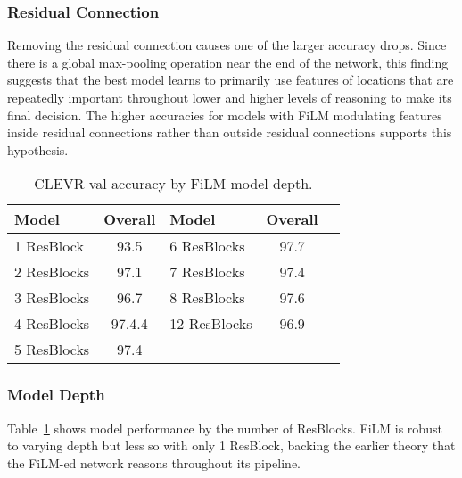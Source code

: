 \documentclass[letterpaper]{article} \usepackage{aaai18}  \usepackage{times}  \usepackage{helvet}  \usepackage{courier}  \usepackage{url}  \usepackage{graphicx}  \frenchspacing  \setlength{\pdfpagewidth}{8.5in}  \setlength{\pdfpageheight}{11in}
\begin{document}
        \subsubsection{Residual Connection}
		Removing the residual connection causes one of the larger accuracy drops. Since there is a global max-pooling operation near the end of the network, this finding suggests that the best model learns to primarily use features of locations that are repeatedly important throughout lower and higher levels of reasoning to make its final decision. The higher accuracies for models with FiLM modulating features inside residual connections rather than outside residual connections supports this hypothesis.
        
\begin{table}[t]
        \centering
        \begin{tabular}{l|c||l|cc|}
        \toprule
        {Model} & {\textbf{Overall}} & {Model} & {\textbf{Overall}} \\
        \midrule
         1 ResBlock &93.5 & 6 ResBlocks &97.7\\2 ResBlocks &97.1 &7 ResBlocks &97.4\\3 ResBlocks &96.7 &8 ResBlocks &97.6\\4 ResBlocks &97.4.4 &12 ResBlocks &96.9\\5 ResBlocks &97.4  &  & \\\end{tabular}
\caption{\label{tab:num-resblocks} CLEVR val accuracy by FiLM model depth.}
\end{table}

		\subsubsection{Model Depth}
        Table~\ref{tab:num-resblocks} shows model performance by the number of ResBlocks. FiLM is robust to varying depth but less so with only 1 ResBlock, backing the earlier theory that the FiLM-ed network reasons throughout its pipeline.
\end{document}
